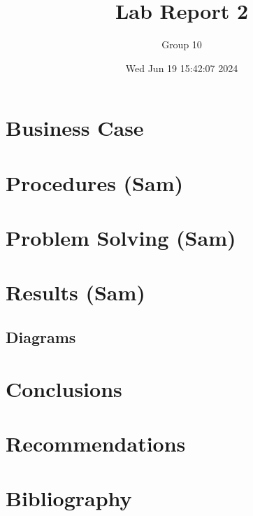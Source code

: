 \documentclass[letterpaper]{article}
\author{Group 10}
\date{Wed Jun 19 15:42:07 2024}
\title{Lab Report 2}
\begin{document}
\maketitle
\tableofcontents

\newpage

\section{Business Case}
\label{sec:org26c3918}
\section{Procedures (Sam)}
\label{sec:org4c49380}
\section{Problem Solving (Sam)}
\label{sec:org68c09cd}
\section{Results (Sam)}
\label{sec:orgf4c2fe5}
\subsection{Diagrams}
\label{sec:orgf6187dc}
\section{Conclusions}
\label{sec:org533c518}
\section{Recommendations}
\label{sec:orga3e4b81}
\section{Bibliography}
\label{sec:orga9f689a}
\end{document}
